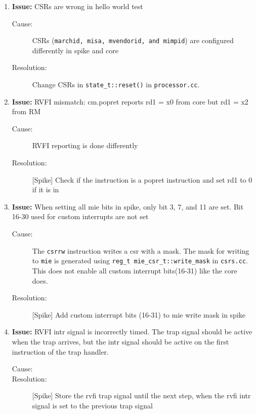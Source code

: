 \begin{enumerate}
\item \textbf{Issue:} CSRs are wrong in hello world test
  \begin{description}
    \item[Cause:] CSRs (\lstinline{marchid, misa, mvendorid, and mimpid}) are configured differently in spike and core
    \item[Resolution:] Change CSRs in \lstinline{state_t::reset()} in \lstinline{processor.cc}.
  \end{description}
  
\item \textbf{Issue:} RVFI mismatch: cm.popret reports rd1 = x0 from core but rd1 = x2 from RM 
  \begin{description}
    \item[Cause:] RVFI reporting is done differently
    \item[Resolution:] [Spike] Check if the instruction is a popret instruction and set rd1 to 0 if it is in 
  \end{description}

\item \textbf{Issue:} When setting all mie bits in spike, only bit 3, 7, and 11 are set. Bit 16-30 used for custom interrupts are not set 
  \begin{description}
    \item[Cause:] The \lstinline{csrrw} instruction writes a csr with a mask. The mask for writing to \lstinline{mie} is generated using \lstinline{reg_t mie_csr_t::write_mask} in \lstinline{csrs.cc}. This does not enable all custom interrupt bits(16-31) like the core does.
    \item[Resolution:] [Spike] Add custom interrupt bits (16-31) to mie write mask in spike
  \end{description}
  

\item \textbf{Issue:} RVFI intr signal is incorrectly timed. The trap signal should be active when the trap arrives, but the intr signal should be active on the first instruction of the trap handler.
  \begin{description}
    \item[Cause:] 
    \item[Resolution:] [Spike] Store the rvfi trap signal until the next step, when the rvfi intr signal is set to the previous trap signal
  \end{description}


\end{enumerate}
